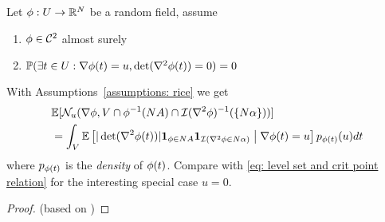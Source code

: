 \begin{assumption}\label{assumptions: rice}
	Let \(\phi: U\to\mathbb{R}^N\) be a random field, assume
	\begin{enumerate}[label=(\roman*)]
		\item\label{assumption: continuity} \(\phi\in\mathcal{C}^2\) almost surely
		\item\label{assumption: critical values of grad phi}
		\(\mathbb{P}(\exists t\in U: \nabla\phi(t) = u, \det(\nabla^2 \phi(t))=0)=0\)
	\end{enumerate}
\end{assumption}

\begin{theorem}\label{thm: rice formula in expectation}
	With Assumptions~\ref{assumptions: rice} we get
	\begin{align*}
		&\mathbb{E}[\mathcal{N}_{u}(
			\nabla\phi,
			V
			\cap \phi^{-1}(N A)
			\cap \mathcal{I}(\nabla^2\phi)^{-1}(\{N\alpha\})
			)
		]\\
		&= \int_V \mathbb{E}\left[
			|\det(\nabla^2 \phi(t))| \mathbf{1}_{\phi \in N A}
			\mathbf{1}_{\mathcal{I}(\nabla^2\phi\in N\alpha)}
			\bigm| \nabla \phi(t) = u
		\right] p_{\phi(t)}(u)dt
	\end{align*}
	where \(p_{\phi(t)}\) is the \emph{density} of \(\phi(t)\). Compare with
	\eqref{eq: level set and crit point relation} for the interesting special
	case \(u=0\).
\end{theorem}
\begin{proof}(based on \cite[Thm. 6.4]{azaisLevelSetsExtrema2009})

\end{proof}